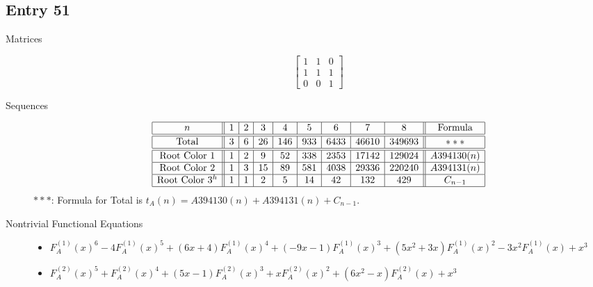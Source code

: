 \documentclass[12pt]{amsart}
\newcommand{\gff}[2]{F_{#2}^{(#1)}(x)}
\newcommand{\gfa}[1]{\gff{#1}{A}}
\begin{document}
\subsection*{Entry 51}
\begin{description}
    \item[Matrices]
    
    \[\begin{bmatrix}
1 & 1 & 0 \\
1 & 1 & 1 \\
0 & 0 & 1
\end{bmatrix}\]
    \item[Sequences]\hspace*{\fill}\vspace{-0.5cm}
    \begin{center}
        \[
        \begin{array}{|c||c|c|c|c|c|c|c|c||c|}\hline
           n  & 1 & 2 & 3 & 4 & 5 & 6 & 7 & 8  & \text{Formula}\\\hline\hline
           \text{Total}  & 3 & 6 & 26 & 146 & 933 & 6433 & 46610 & 349693 & *** \\\hline\hline
           \text{Root Color }1 & 1 & 2 & 9 & 52 & 338 & 2353 & 17142 & 129024 & A394130(n)\\\hline
           \text{Root Color }2 & 1 & 3 & 15 & 89 & 581 & 4038 & 29336 & 220240 & A394131(n)\\\hline
           \text{Root Color }3^{h} & 1 & 1 & 2 & 5 & 14 & 42 & 132 & 429 & C_{n-1}\\\hline
        \end{array}
        \]
        $***$: Formula for Total is $t_A(n)=A394130(n)+A394131(n)+C_{n-1}$.
    \end{center}
    
    \item[Nontrivial Functional Equations]\hspace*{\fill}

    \begin{itemize}
\item $\gfa{1}^6-4\gfa{1}^5+(6x + 4)\gfa{1}^4+(-9x - 1)\gfa{1}^3+(5x^2 + 3x)\gfa{1}^2-3x^2\gfa{1}+x^3$


\item $\gfa{2}^5+\gfa{2}^4+(5x - 1)\gfa{2}^3+x\gfa{2}^2+(6x^2 - x)\gfa{2}+x^3$

\end{itemize}
    
\end{description}
\end{document}
